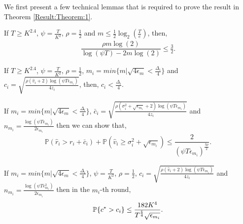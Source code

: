 We first present a few technical lemmas that is required  to prove the result in Theorem \ref{Result:Theorem:1}.

\begin{lemma}
\label{proofTheorem:Lemma:1}
If $T\geq K^{2.4}$, $\psi=\frac{T}{ K^2}$, $\rho=\frac{1}{2}$ and $m\leq \frac{1}{2} \log_2\left(\frac{T}{e}\right) $, then,
\begin{align*}
\dfrac{\rho m \log(2)}{\log(\psi T) - 2m\log( 2)} \leq \frac{3}{2}.
\end{align*}
\end{lemma}



\begin{lemma}
\label{proofTheorem:Lemma:2}
If $T\geq K^{2.4}$, $\psi=\frac{T}{ K^2}$, $\rho =\frac{1}{2}$, $m_i = min\lbrace m|\sqrt{4\epsilon_{m} } < \frac{\Delta_i}{4} \rbrace $ and $c_{i} =\sqrt{\frac{\rho (\hat{v}_i + 2)\log (\psi T\epsilon_{m_{i}})}{4 z_i}}$, then,
$c_{i} < \frac{\Delta_i}{4}$.
\end{lemma}



\begin{lemma}
\label{proofTheorem:Lemma:3}
If $m_i = min\lbrace m|\sqrt{4\epsilon_{m} } < \frac{\Delta_i}{4} \rbrace $,  $\bar{c}_i=\sqrt{\frac{\rho (\sigma_{i}^{2}+\sqrt{\epsilon_{m_{i}}} + 2)\log(\psi T\epsilon_{m_{i}})}{4z_i}}$ and $n_{m_i} = \frac{\log{(\psi T\epsilon_{m_{i}})}}{2\epsilon_{m_{i}}}$ then we can show that,
\begin{align*}
\mathbb{P}\left( \hat{r}_{i} > r_{i}+ \bar{c}_i\right) 
+ \mathbb{P}\left( \hat{v}_{i}\geq \sigma_{i}^{2}+\sqrt{\epsilon_{m_{i}}}\right) \leq \dfrac{2}{(\psi  T\epsilon_{m_{i}})^{\frac{3\rho}{2}}}.
\end{align*}
\end{lemma}



\begin{lemma}
\label{proofTheorem:Lemma:4}
If $m_i = min\lbrace m|\sqrt{4\epsilon_{m} } < \frac{\Delta_i}{4} \rbrace $, $\psi=\frac{T}{ K^2}$, $\rho=\frac{1}{2}$, $c_{i} =\sqrt{\frac{\rho(\hat{v}_i + 2)\log (\psi T\epsilon_{m_{i}})}{4 z_{i}}}$ and $n_{m_i}=\frac{\log{(\psi T\epsilon_{m_{i}}^{2})}}{2\epsilon_{m_{i}}}$ then in the $m_i$-th round, 
\begin{align*}
\mathbb{P}\lbrace c^{*} > c_i \rbrace  \leq \dfrac{182 K^4}{T^{\frac{5}{4}}\sqrt{\epsilon_{m_i}}}.
\end{align*}
\end{lemma}



